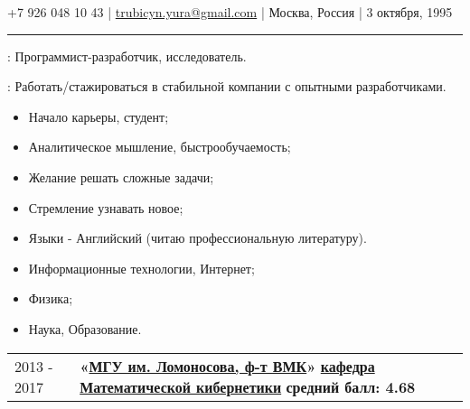 \documentclass[11pt]{article}
\begin{document}
 
%
 
\vspace{0.5em}
 
\noindent +7 926 048 10 43  |   \href{mailto:trubicyn.yura@gmail.com}{trubicyn.yura@gmail.com}  |  Москва, Россия  | 3 октября, 1995
 
\vspace{0.5em}
 
\hrule
 
\vspace{1.5em}

: Программист-разработчик, исследователь. 
 
\vspace{1em} 
 
: Работать/стажироваться в стабильной компании с опытными разработчиками. 
 
\vspace{1em}
 
\begin{itemize}
\item Начало карьеры, студент;
\item Аналитическое мышление, быстрообучаемость;
\item Желание решать сложные задачи;
\item Стремление узнавать новое;
\item Языки - Английский (читаю профессиональную литературу).
\end{itemize}

\vspace{1em}

\begin{itemize}
\item Информационные технологии, Интернет;
\item Физика;
\item Наука, Образование.
\end{itemize}

\vspace{1em} 
 
 
\begin{longtable} {l | p{}}
 
2013 - 2017 & {\textbf{«\href{http://cs.msu.ru}{МГУ им. Ломоносова, ф-т ВМК}»} \newline
 \textbf{\href{http://mk.cs.msu.ru}{кафедра Математической кибернетики}} \newline
 \textbf{средний балл: 4.68}}\\  

\end{longtable}
\end{document}
